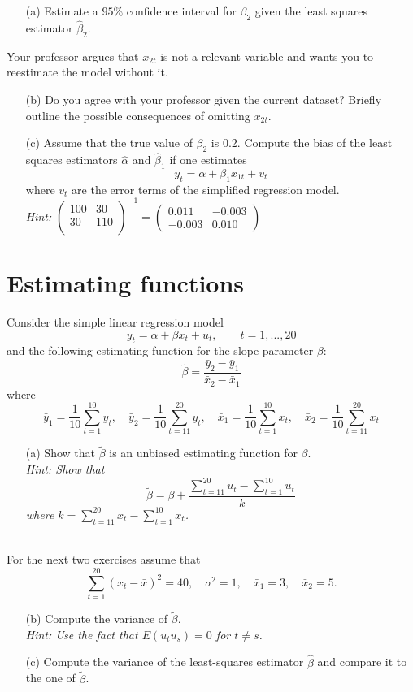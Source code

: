 \documentclass{article}
\begin{document}
\begin{enumerate}
	\item[(a)] Estimate a $95\%$ confidence interval for $\beta_2$ given the least squares estimator $\hat{\beta}_2$.
\end{enumerate}
Your professor argues that $x_{2t}$ is not a relevant variable and wants you to reestimate the model without it. 
\begin{enumerate}
	\item[(b)] Do you agree with your professor given the current dataset? Briefly outline the possible consequences of omitting $x_{2t}$.
	\item[(c)] Assume that the true value of $\beta_2$ is 0.2. Compute the bias of the least squares estimators $\hat{\alpha}$ and $\hat{\beta}_1$ if one estimates
	$$y_t = \alpha + \beta_1 x_{1t} + v_t$$
	where $v_t$ are the error terms of the simplified regression model.\\\textit{Hint:}
$
\begin{pmatrix}
100 &  30\\
30  &110\\
\end{pmatrix}^{-1}=
\begin{pmatrix}
 0.011 &  -0.003\\
-0.003 &   0.010
\end{pmatrix}
$
\end{enumerate}
\newpage
\section{Estimating functions}
Consider the simple linear regression model
$$y_t = \alpha + \beta x_t + u_t, \qquad t=1,...,20$$
and the following estimating function for the slope parameter $\beta$:
$$\tilde{\beta} = \frac{\bar{y}_2-\bar{y}_1}{\bar{x}_2 -\bar{x}_1}$$
where
$$\bar{y}_1 = \frac{1}{10} \sum_{t=1}^{10} y_t, \quad \bar{y}_2 = \frac{1}{10} \sum_{t=11}^{20} y_t, \quad \bar{x}_1 = \frac{1}{10} \sum_{t=1}^{10} x_t, \quad \bar{x}_2 = \frac{1}{10} \sum_{t=11}^{20} x_t$$
\begin{itemize}
	\item[(a)] Show that $\tilde{\beta}$ is an unbiased estimating function for $\beta$.\\\textit{Hint: Show that }$$\tilde{\beta} = \beta + \frac{\sum_{t=11}^{20} u_t - \sum_{t=1}^{10}u_t}{k}$$
	\textit{where $k=\sum_{t=11}^{20} x_t - \sum_{t=1}^{10} x_t$.}
\end{itemize}
~\\ \newline
For the next two exercises assume that 
$$\sum_{t=1}^{20}(x_t - \bar{x})^2 = 40, \quad \sigma^2=1, \quad \bar{x}_1 = 3, \quad \bar{x}_2 = 5.$$
\begin{itemize}
	\item[(b)] Compute the variance of $\tilde{\beta}$.\\
	\textit{Hint: Use the fact that $E(u_t u_s) = 0$ for $t\neq s$.}
	\item[(c)]  Compute the variance of the least-squares estimator $\hat{\beta}$ and compare it to the one of $\tilde{\beta}$.
	
\end{itemize}
\end{document}
